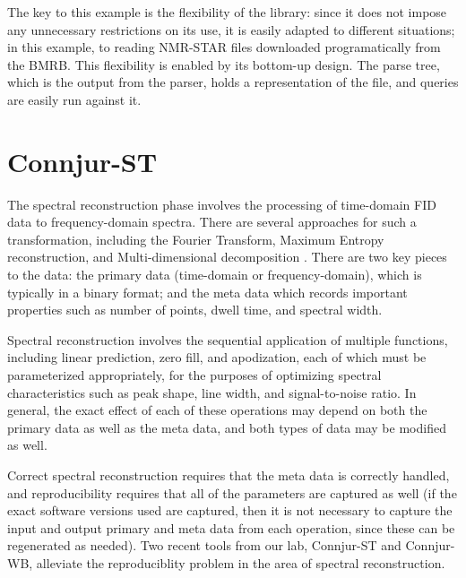The key to this example is the flexibility of the library: since it does not
impose any unnecessary restrictions on its use, it is easily adapted to
different situations; in this example, to reading NMR-STAR files downloaded
programatically from the BMRB.  This flexibility is enabled by its bottom-up
design.  The parse tree, which is the output from the parser, holds a 
representation of the file, and queries are easily run against it.


\section{Connjur-ST}
The spectral reconstruction phase involves the processing of time-domain 
FID data to frequency-domain spectra.  There are several approaches for such
a transformation, including the Fourier Transform, Maximum Entropy reconstruction,
and Multi-dimensional decomposition \cite{nmrpipe, rnmrtk, mdd}.  There are
two key pieces to the data: the primary data (time-domain or frequency-domain),
which is typically in a binary format; and the meta data which records
important properties such as number of points, dwell time, and spectral width.

Spectral reconstruction involves the sequential application
of multiple functions, including linear prediction, zero fill, and apodization,
each of which must be parameterized appropriately, for the purposes of 
optimizing spectral characteristics such as peak shape, line width, and
signal-to-noise ratio.  In general, the exact effect of each of these operations
may depend on both the primary data as well as the meta data, and both types of
data may be modified as well.

Correct spectral reconstruction requires that the meta data is correctly 
handled, and reproducibility requires that all of the parameters are captured
as well (if the exact software versions used are captured, then it is not
necessary to capture the input and output primary and meta data from each
operation, since these can be regenerated as needed).  Two recent tools from
our lab, Connjur-ST \cite{connjur-st} and Connjur-WB, alleviate the
reproduciblity problem in the area of spectral reconstruction.

